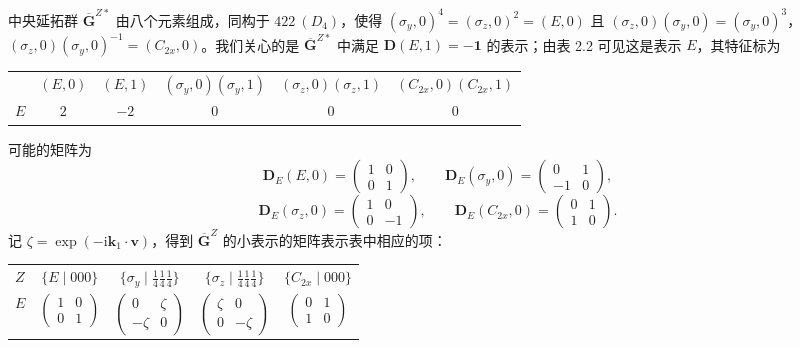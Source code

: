 中央延拓群 $\overline{\mathbf{G}}^{Z*}$ 由八个元素组成，同构于 $422\ (D_{4})$，使得 $(\sigma_{y}, 0)^{4} = (\sigma_{z}, 0)^{2} = (E, 0)$ 且 $(\sigma_{z}, 0)(\sigma_{y}, 0) = (\sigma_{y}, 0)^{3}$，$(\sigma_{z}, 0)(\sigma_{y}, 0)^{-1} = (C_{2x}, 0)$。我们关心的是 $\overline{\mathbf{G}}^{Z*}$ 中满足 $\mathbf{D}(E, 1) = -\mathbf{1}$ 的表示；由表 2.2 可见这是表示 $E$，其特征标为
\begin{center}
\begin{tabular}{lccccc}
 & $(E, 0)$ & $(E, 1)$ & $(\sigma_{y}, 0)(\sigma_{y}, 1)$ & $(\sigma_{z}, 0)(\sigma_{z}, 1)$ & $(C_{2x}, 0)(C_{2x}, 1)$\\
$E$ & $2$ & $-2$ & $0$ & $0$ & $0$
\end{tabular}
\end{center}
可能的矩阵为
\begin{equation*}
\mathbf{D}_{E}(E, 0) = \begin{pmatrix} 1 & 0\\ 0 & 1 \end{pmatrix}, \qquad
\mathbf{D}_{E}(\sigma_{y}, 0) = \begin{pmatrix} 0 & 1\\ -1 & 0 \end{pmatrix},
\end{equation*}
\begin{equation*}
\mathbf{D}_{E}(\sigma_{z}, 0) = \begin{pmatrix} 1 & 0\\ 0 & -1 \end{pmatrix}, \qquad
\mathbf{D}_{E}(C_{2x}, 0) = \begin{pmatrix} 0 & 1\\ 1 & 0 \end{pmatrix}.
\end{equation*}
记 $\zeta = \exp(-\mathrm{i}\mathbf{k}_{1} \cdot \mathbf{v})$，得到 $\overline{\mathbf{G}}^{Z}$ 的小表示的矩阵表示表中相应的项：
\begin{center}
\begin{tabular}{lcccc}
$Z$ & $\{E \mid 000\}$ & $\{\sigma_{y} \mid {\frac{1}{4}}{\frac{1}{4}}{\frac{1}{4}}\}$ & $\{\sigma_{z} \mid {\frac{1}{4}}{\frac{1}{4}}{\frac{1}{4}}\}$ & $\{C_{2x} \mid 000\}$\\[0.5ex]
$E$ & $\begin{pmatrix} 1 & 0\\ 0 & 1 \end{pmatrix}$ &
$\begin{pmatrix} 0 & \zeta\\ -\zeta & 0 \end{pmatrix}$ &
$\begin{pmatrix} \zeta & 0\\ 0 & -\zeta \end{pmatrix}$ &
$\begin{pmatrix} 0 & 1\\ 1 & 0 \end{pmatrix}$
\end{tabular}
\end{center}

